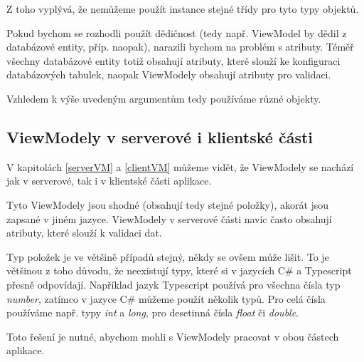Z toho vyplývá, že nemůžeme použít instance stejné třídy pro tyto typy objektů.

Pokud bychom se rozhodli použít dědičnost (tedy např. ViewModel by dědil z databázové entity, příp. naopak), narazili bychom na problém s atributy.
Téměř všechny databázové entity totiž obsahují atributy, které slouží ke konfiguraci databázových tabulek, naopak ViewModely obsahují atributy pro validaci. 

Vzhledem k výše uvedeným argumentům tedy používáme různé objekty.


\subsection{ViewModely v serverové i klientské části}

V kapitolách \ref{serverVM} a \ref{clientVM} můžeme vidět, že ViewModely se nachází jak v serverové, tak i v klientské části aplikace. 

Tyto ViewModely jsou shodné (obsahují tedy stejné položky), akorát jsou zapsané v jiném jazyce. ViewModely v serverové části navíc často obsahují atributy, které slouží k validaci dat.

Typ položek je ve většině případů stejný, někdy se ovšem může lišit. To je většinou z toho důvodu, že neexistují typy, které si v jazycích C\# a Typescript přesně odpovídají.
Například jazyk Typescript používá pro všechna čísla typ \textit{number}, zatímco v jazyce C\# můžeme použít několik typů. 
Pro celá čísla používáme např. typy \textit{int} a \textit{long}, pro desetinná čísla \textit{float} či \textit{double}.

Toto řešení je nutné, abychom mohli s ViewModely pracovat v obou částech aplikace.